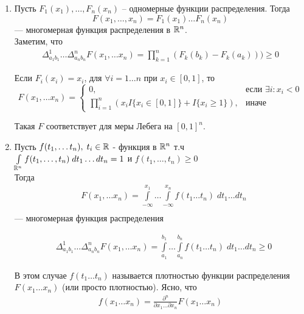 

\begin{example}
	\begin{enumerate}
		\item 
			Пусть $F_1(x_1), \ldots, F_n(x_n)$ -- одномерные функции распределения. 
			Тогда
			\begin{equation*}
				F(x_1, \ldots, x_n) = F_1(x_1) \ldots F_n(x_n)
			\end{equation*}
			--- многомерная функция распределения в $\mathbb{R}^n$.\\
						
			Заметим, что 
			\begin{align*}
				\Delta_{a_1 b_1}^1 \ldots \Delta_{a_n b_n}^n F(x_1, \ldots x_n) = 
				\prod\limits_{k = 1}^n (F_k(b_k) - F_k(a_k)))	\geq 0
			\end{align*}
			
			Если $F_i(x_i) = x_i$, для $\forall i = 1 \ldots n$ при $x_i \in [0, 1]$, то
			\begin{equation*}
				F(x_1, \ldots x_n) =
				\begin{cases}
					0, &\text{если } \exists i : x_i < 0\\					
					\prod\limits_{i=1}^n (x_i I\{x_i \in [0, 1]\} + I\{x_i \geq 1\}), &\text{иначе}
				\end{cases}
			\end{equation*}
			
			Такая $F$ соответствует для меры Лебега на $[0, 1]^n$.
		
		\item 
			Пусть $f(t_1, \ldots t_n),\; t_i \in \mathbb{R}$ - функция в $\mathbb{R}^n$ т.ч\\
			$\int\limits_{\mathbb{R}^n} f(t_1, \ldots, t_n)\; d t_1 \ldots d t_n = 1$ и 
			$f(t_1, \ldots, t_n) \geq 0$\\
			
			Тогда
			\begin{align*}
				&F(x_1, \ldots x_n) = \int\limits_{-\infty}^{x_1} \ldots 
															\int\limits_{-\infty}^{x_n} f(t_1 \ldots t_n)\; d t_1 \ldots d t_n\\
			\end{align*}
			--- многомерная функция распределения
			
			\begin{align*}
				&\Delta_{a_1 b_1}^1 \ldots \Delta_{a_n b_n}^n F(x_1, \ldots x_n) = \int\limits_{a_1}^{b_1} \ldots 									\int\limits_{a_n}^{b_n} f(t_1 \ldots t_n)\; d t_1 \ldots d t_n \geq 0		
			\end{align*}
			
			В этом случае $f(t_1 \ldots t_n)$ называется плотностью функции распределения $F(x_1 \ldots x_n)$ (или просто плотностью). Ясно, что 
			\begin{align*}
				f(x_1 \ldots x_n) = \frac{\partial^n}{\partial x_1 \ldots \partial x_n} F(x_1 \ldots x_n)\\
			\end{align*}
			
	\end{enumerate}
\end{example}


